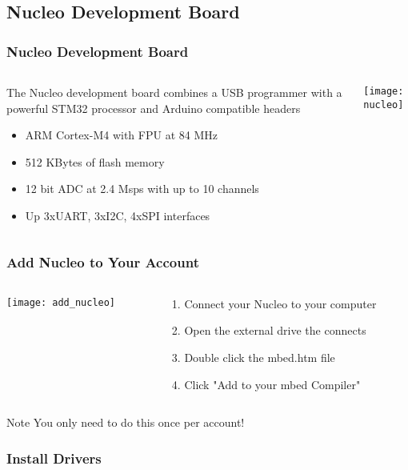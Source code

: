 \subsection{Nucleo Development Board}
\label{sub:nucleo}
\begin{frame}
	\frametitle{Nucleo Development Board}
	\begin{columns}[T]
		\begin{column}{0.5\textwidth}
			The Nucleo development board combines a USB programmer with a powerful STM32 processor and Arduino compatible headers
			\begin{itemize}
				\item ARM Cortex-M4 with FPU at 84 MHz
				\item 512 KBytes of flash memory
				\item 12 bit ADC at 2.4 Msps with up to 10 channels
				\item Up 3xUART, 3xI2C, 4xSPI interfaces
			\end{itemize}
		\end{column}
		\begin{column}{0.5\textwidth}
			\texttt{[image: nucleo]}
		\end{column}
	\end{columns}
\end{frame}

\begin{frame}
	\frametitle{Add Nucleo to Your Account}
	\begin{columns}[c]
		\begin{column}{0.5\textwidth}
			\texttt{[image: add\_nucleo]}
		\end{column}
		\begin{column}{0.5\textwidth}
			\begin{enumerate}
				\item Connect your Nucleo to your computer
				\item Open the external drive the connects
				\item Double click the mbed.htm file
				\item Click "Add to your mbed Compiler"
			\end{enumerate}
		\end{column}
	\end{columns}
	\begin{block}{Note}
		You only need to do this once per account!
	\end{block}
\end{frame}

\begin{frame}
	\frametitle{Install Drivers}
\end{frame}